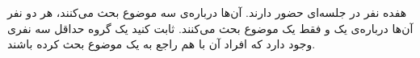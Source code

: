     \p 
هفده نفر در جلسه‌ای حضور دارند. آن‌ها درباره‌ی سه موضوع بحث می‌کنند، هر دو نفر آن‌ها درباره‌ی یک و فقط یک موضوع بحث می‌کنند. ثابت کنید یک گروه حداقل سه نفری وجود دارد که افراد آن با هم راجع به یک موضوع بحث کرده باشند.